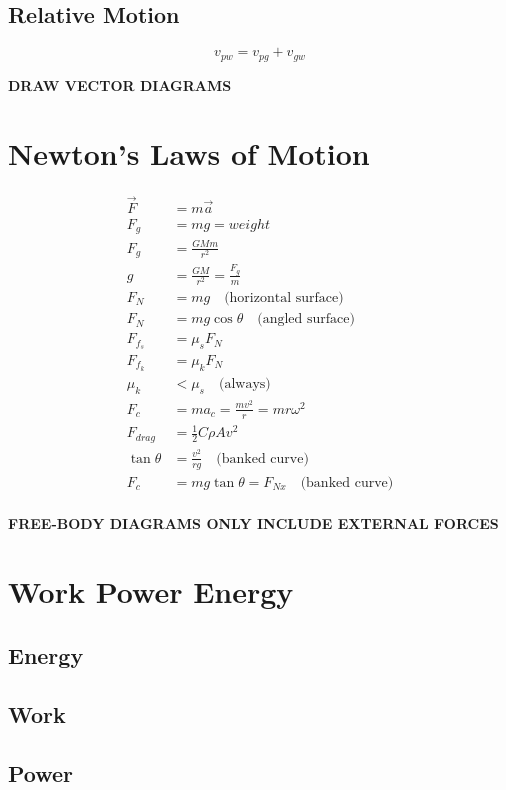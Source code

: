 \documentclass[letterpaper]{article}
\begin{document}
\subsection{Relative Motion}
\begin{equation*}
    v_{pw} = v_{pg} + v_{gw}
\end{equation*}

\bigskip
\centerline{\textbf{DRAW VECTOR DIAGRAMS}}

\section{Newton's Laws of Motion}
\begin{align*}
    \vec{F} &= m \vec{a} \\
    F_g &= mg = weight \\
    F_g &= \frac{GMm}{r^2} \\
    g &= \frac{GM}{r^2} = \frac{F_g}{m} \\
    F_N &= mg \quad \textrm{(horizontal surface)} \\
    F_N &= mg \cos \theta \quad \textrm{(angled surface)} \\
    F_{f_s} &= \mu_s F_N \\
    F_{f_k} &= \mu_k F_N \\
    \mu_k &< \mu_s \quad \textrm{(always)} \\
    F_c &= m a_c = \frac{m v^2}{r} = m r \omega^2 \\
    F_{drag} &= \tfrac{1}{2} C \rho A v^2 \\
    \tan \theta &= \frac{v^2}{rg} \quad \textrm{(banked curve)} \\
    F_c &= mg \tan \theta = F_{Nx} \quad \textrm{(banked curve)} \\
\end{align*}

\bigskip
\centerline{\textbf{FREE-BODY DIAGRAMS ONLY INCLUDE EXTERNAL FORCES}}

\section{Work Power Energy}
\subsection{Energy}
\subsection{Work}
\subsection{Power}
\end{document}
